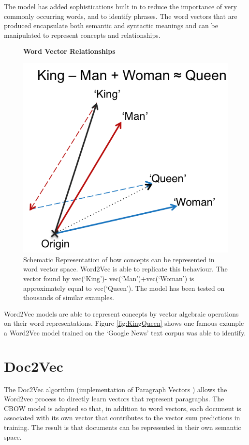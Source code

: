 The model has added sophistications built in to reduce the importance of very commonly occurring words, and to identify phrases. The word vectors that are produced encapsulate both semantic and syntactic meanings and can be manipulated to represent concepts and relationships.
\begin{figure}[H]
    \centering
    \textbf{Word Vector Relationships}\par\medskip
    \includegraphics[scale=0.6]{Natural_Language_Processing/KINGQUEEN.png}
    \caption{Schematic Representation of how concepts can be represented in word vector space. Word2Vec is able to replicate this behaviour. The vector found by vec(‘King’)- vec(‘Man’)+vec(‘Woman’) is approximately equal to vec(‘Queen’). The model has been tested on thousands of similar examples\cite{word2vec2}\cite{word2veckingqueen}.}
     \label{fig:KINGQUEEN}
\end{figure}
Word2Vec models are able to represent concepts by vector algebraic operations on their word representations. Figure \ref{fig:KingQueen} shows one famous example a Word2Vec model trained on the `Google News' text corpus was able to identify. 

\section{Doc2Vec}
The Doc2Vec algorithm \cite{gensim}(implementation of Paragraph Vectors \cite{doc2vec}) allows the Word2vec process to directly learn vectors that represent paragraphs. The CBOW model is adapted so that, in addition to word vectors, each document is associated with its own vector that contributes to the vector sum predictions in training. The result is that documents can be represented in their own semantic space.

